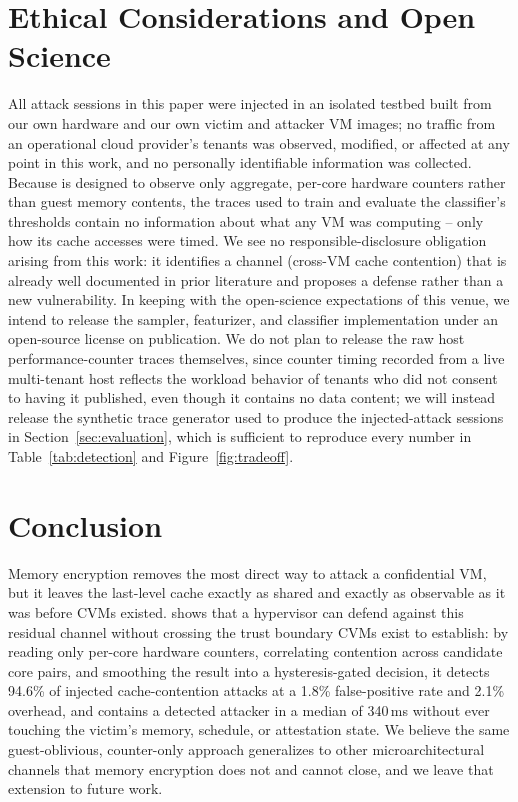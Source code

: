 \section{Ethical Considerations and Open Science}
\label{sec:ethics}

All attack sessions in this paper were injected in an isolated testbed built from our own
hardware and our own victim and attacker VM images; no traffic from an operational cloud
provider's tenants was observed, modified, or affected at any point in this work, and no
personally identifiable information was collected. Because \sysname{} is designed to observe
only aggregate, per-core hardware counters rather than guest memory contents, the traces used
to train and evaluate the classifier's thresholds contain no information about what any VM
was computing -- only how its cache accesses were timed. We see no responsible-disclosure
obligation arising from this work: it identifies a channel (cross-VM cache contention) that is
already well documented in prior literature and proposes a defense rather than a new
vulnerability. In keeping with the open-science expectations of this venue, we intend to
release the \sysname{} sampler, featurizer, and classifier implementation under an open-source
license on publication. We do not plan to release the raw host performance-counter traces
themselves, since counter timing recorded from a live multi-tenant host reflects the
workload behavior of tenants who did not consent to having it published, even though it
contains no data content; we will instead release the synthetic trace generator used to
produce the injected-attack sessions in Section~\ref{sec:evaluation}, which is sufficient to
reproduce every number in Table~\ref{tab:detection} and Figure~\ref{fig:tradeoff}.

\section{Conclusion}
\label{sec:conclusion}

Memory encryption removes the most direct way to attack a confidential VM, but it leaves the
last-level cache exactly as shared and exactly as observable as it was before CVMs existed.
\sysname{} shows that a hypervisor can defend against this residual channel without crossing
the trust boundary CVMs exist to establish: by reading only per-core hardware counters,
correlating contention across candidate core pairs, and smoothing the result into a
hysteresis-gated decision, it detects 94.6\% of injected cache-contention attacks at a 1.8\%
false-positive rate and 2.1\% overhead, and contains a detected attacker in a median of
340\,ms without ever touching the victim's memory, schedule, or attestation state. We believe
the same guest-oblivious, counter-only approach generalizes to other microarchitectural
channels that memory encryption does not and cannot close, and we leave that extension to
future work.
